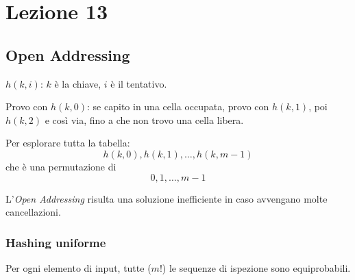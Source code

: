 \section{Lezione 13}

\subsection{Open Addressing} \label{hash:openaddessing}

$h(k,i)$: $k$ è la chiave, $i$ è il tentativo.\par
Provo con $h(k,0)$: se capito in una cella occupata, provo con $h(k,1)$, poi $h(k,2)$
e così via, fino a che non trovo una cella libera.

Per esplorare tutta la tabella:
$$h(k,0), h(k,1), \dots, h(k,m-1)$$
che è una permutazione di 
$$0,1,\dots,m-1$$




L'\emph{Open Addressing} risulta una soluzione inefficiente in caso
avvengano molte cancellazioni.

\subsubsection{Hashing uniforme}

Per ogni elemento di input, tutte ($m!$) le sequenze di ispezione
sono equiprobabili.

